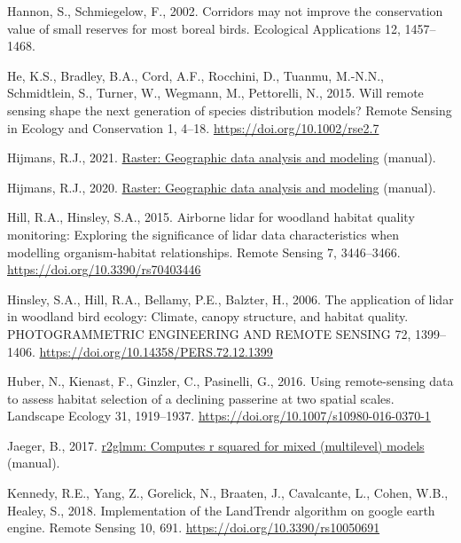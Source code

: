 \documentclass[
  12pt,
]{article}
\newlength{\cslhangindent}
\newlength{\cslentryspacingunit} %
\newenvironment{CSLReferences}[2] %
 {%
  \setlength{\parindent}{0pt}
  \ifodd #1
  \let\oldpar\par
  \def\par{\hangindent=\cslhangindent\oldpar}
  \fi
  \setlength{\parskip}{#2\cslentryspacingunit}
 }%
 {}
\begin{document}
\begin{CSLReferences}{1}{0}
\leavevmode{}%
Hannon, S., Schmiegelow, F., 2002. Corridors may not improve the conservation value of small reserves for most boreal birds. Ecological Applications 12, 1457--1468.

\leavevmode{}%
He, K.S., Bradley, B.A., Cord, A.F., Rocchini, D., Tuanmu, M.-N.N., Schmidtlein, S., Turner, W., Wegmann, M., Pettorelli, N., 2015. Will remote sensing shape the next generation of species distribution models? Remote Sensing in Ecology and Conservation 1, 4--18. \url{https://doi.org/10.1002/rse2.7}

\leavevmode{}%
Hijmans, R.J., 2021. \href{https://CRAN.R-project.org/package=raster}{Raster: Geographic data analysis and modeling} (manual).

\leavevmode{}%
Hijmans, R.J., 2020. \href{https://CRAN.R-project.org/package=raster}{Raster: Geographic data analysis and modeling} (manual).

\leavevmode{}%
Hill, R.A., Hinsley, S.A., 2015. Airborne lidar for woodland habitat quality monitoring: Exploring the significance of lidar data characteristics when modelling organism-habitat relationships. Remote Sensing 7, 3446--3466. \url{https://doi.org/10.3390/rs70403446}

\leavevmode{}%
Hinsley, S.A., Hill, R.A., Bellamy, P.E., Balzter, H., 2006. The application of lidar in woodland bird ecology: Climate, canopy structure, and habitat quality. {PHOTOGRAMMETRIC} {ENGINEERING} {AND} {REMOTE} {SENSING} 72, 1399--1406. \url{https://doi.org/10.14358/PERS.72.12.1399}

\leavevmode{}%
Huber, N., Kienast, F., Ginzler, C., Pasinelli, G., 2016. Using remote-sensing data to assess habitat selection of a declining passerine at two spatial scales. Landscape Ecology 31, 1919--1937. \url{https://doi.org/10.1007/s10980-016-0370-1}

\leavevmode{}%
Jaeger, B., 2017. \href{https://CRAN.R-project.org/package=r2glmm}{r2glmm: Computes r squared for mixed (multilevel) models} (manual).

\leavevmode{}%
Kennedy, R.E., Yang, Z., Gorelick, N., Braaten, J., Cavalcante, L., Cohen, W.B., Healey, S., 2018. Implementation of the {LandTrendr} algorithm on google earth engine. Remote Sensing 10, 691. \url{https://doi.org/10.3390/rs10050691}


\end{CSLReferences}
\end{document}
